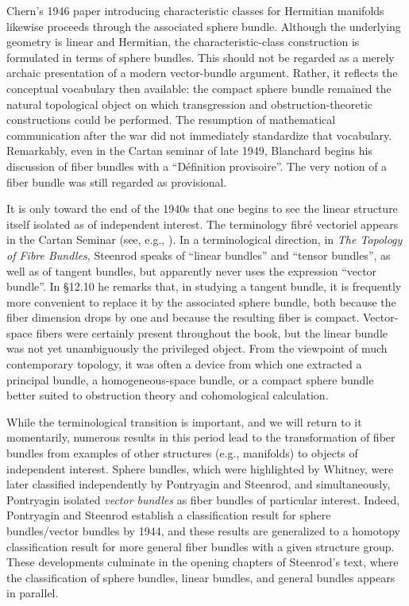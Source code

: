 \documentclass[11pt,leqno]{article}
\renewcommand{\1}{{\rm 1\hspace*{-0.4ex}%
\rule{0.1ex}{1.52ex}\hspace*{0.2ex}}}
\newcommand{\<}[1]{{\langle}#1 {\rangle}}
\newcounter{intro}
\theoremstyle{plain}
\theoremstyle{definition}
\theoremstyle{remark}
\numberwithin{equation}{subsection}
\begin{document}
Chern's 1946 paper introducing characteristic classes for Hermitian manifolds \cite{Chern1946} likewise proceeds through the associated sphere bundle. Although the underlying geometry is linear and Hermitian, the characteristic-class construction is formulated in terms of sphere bundles. This should not be regarded as a merely archaic presentation of a modern vector-bundle argument. Rather, it reflects the conceptual vocabulary then available: the compact sphere bundle remained the natural topological object on which transgression and obstruction-theoretic constructions could be performed. The resumption of mathematical communication after the war did not immediately standardize that vocabulary. Remarkably, even in the Cartan seminar of late 1949, Blanchard begins his discussion of fiber bundles with a ``Définition provisoire''.  The very notion of a fiber bundle was still regarded as provisional.

It is only toward the end of the 1940s that one begins to see the linear structure itself isolated as of independent interest. The terminology fibr\'e vectoriel appears in the Cartan Seminar (see, e.g., \cite[6-12]{Cartan1949GeneralitesI}).  In a terminological direction, in {\em The Topology of Fibre Bundles}, Steenrod speaks of ``linear bundles'' and ``tensor bundles'', as well as of tangent bundles, but apparently never uses the expression ``vector bundle''. In \S 12.10 he remarks that, in studying a tangent bundle, it is frequently more convenient to replace it by the associated sphere bundle, both because the fiber dimension drops by one and because the resulting fiber is compact. Vector-space fibers were certainly present throughout the book, but the linear bundle was not yet unambiguously the privileged object. From the viewpoint of much contemporary topology, it was often a device from which one extracted a principal bundle, a homogeneous-space bundle, or a compact sphere bundle better suited to obstruction theory and cohomological calculation.

While the terminological transition is important, and we will return to it momentarily, numerous results in this period lead to the transformation of fiber bundles from examples of other structures (e.g., manifolds) to objects of independent interest.  Sphere bundles, which were highlighted by Whitney, were later classified independently by Pontryagin and Steenrod, and simultaneously, Pontryagin isolated {\em vector bundles} as fiber bundles of particular interest.  Indeed, Pontryagin and Steenrod establish a classification result for sphere bundles/vector bundles by 1944, and these results are generalized to a homotopy classification result for more general fiber bundles with a given structure group.  These developments culminate in the opening chapters of Steenrod's text, where the classification of sphere bundles, linear bundles, and general bundles appears in parallel.
\end{document}
